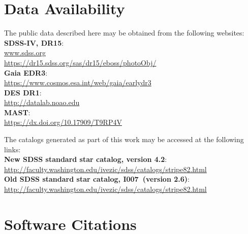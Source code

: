 \documentclass[fleqn,usenatbib]{mnras}
\newcommand{\pO}{\hbox{I007}}
\begin{document}

\section*{Data Availability \label{sec:DataAv}}

\noindent The public data described here may be obtained from the following websites: \\
{\bf SDSS-IV, DR15}:\\
\url{www.sdss.org}\\ 
\url{https://dr15.sdss.org/sas/dr15/eboss/photoObj/}\\
{\bf Gaia EDR3}:\\
\url{https://www.cosmos.esa.int/web/gaia/earlydr3}\\
{\bf DES DR1}:\\
\url{http://datalab.noao.edu}\\
{\bf MAST}:\\
\url{https://dx.doi.org/10.17909/T9RP4V}

\vspace{3mm}
\noindent The catalogs generated as part of this work may be accessed at the following links:\\
{\bf New SDSS standard star catalog, version 4.2}:\\
\url{http://faculty.washington.edu/ivezic/sdss/catalogs/stripe82.html}\\
{\bf Old SDSS standard star catalog, \pO\ (version 2.6)}:\\
\url{http://faculty.washington.edu/ivezic/sdss/catalogs/stripe82.html}\\


\section*{Software Citations \label{sec:soft}}
\end{document}
